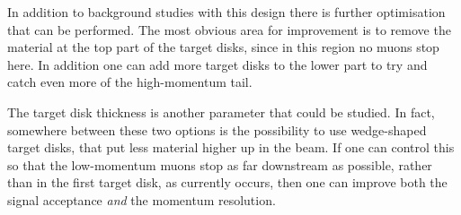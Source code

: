 In addition to background studies with this design there is further optimisation that can be performed.
The most obvious area for improvement is to remove the material at the top part of the target disks, since in this region no muons stop here.
In addition one can add more target disks to the lower part to try and catch even more of the high-momentum tail.

The target disk thickness is another parameter that could be studied.
In fact, somewhere between these two options is the possibility to use wedge-shaped target disks, that put less material higher up in the beam.
If one can control this so that the low-momentum muons stop as far downstream as possible, rather than in the first target disk, as currently occurs, then one can improve both the signal acceptance \emph{and} the momentum resolution.
